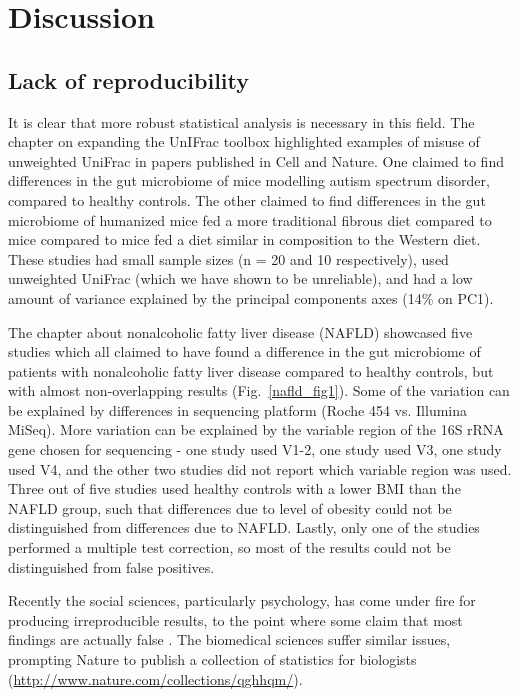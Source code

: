 \chapter{Discussion}

\section{Lack of reproducibility}
It is clear that more robust statistical analysis is necessary in this field. The chapter on expanding the UnIFrac toolbox highlighted examples of misuse of unweighted UniFrac in papers published in Cell and Nature. One claimed to find differences in the gut microbiome of mice modelling autism spectrum disorder, compared to healthy controls. The other claimed to find differences in the gut microbiome of humanized mice fed a more traditional fibrous diet compared to mice compared to mice fed a diet similar in composition to the Western diet. These studies had small sample sizes (n = 20 and 10 respectively), used unweighted UniFrac (which we have shown to be unreliable), and had a low amount of variance explained by the principal components axes (14\% on PC1).

The chapter about nonalcoholic fatty liver disease (NAFLD) showcased five studies which all claimed to have found a difference in the gut microbiome of patients with nonalcoholic fatty liver disease compared to healthy controls, but with almost non-overlapping results (Fig.~\ref{nafld_fig1}). Some of the variation can be explained by differences in sequencing platform (Roche 454 vs. Illumina MiSeq). More variation can be explained by the variable region of the 16S rRNA gene chosen for sequencing - one study used V1-2, one study used V3, one study used V4, and the other two studies did not report which variable region was used. Three out of five studies used healthy controls with a lower BMI than the NAFLD group, such that differences due to level of obesity could not be distinguished from differences due to NAFLD. Lastly, only one of the studies performed a multiple test correction, so most of the results could not be distinguished from false positives.

Recently the social sciences, particularly psychology, has come under fire for producing irreproducible results, to the point where some claim that most findings are actually false \cite{ioannidis2005most}. The biomedical sciences suffer similar issues, prompting Nature to publish a collection of statistics for biologists (\url{http://www.nature.com/collections/qghhqm/}).

